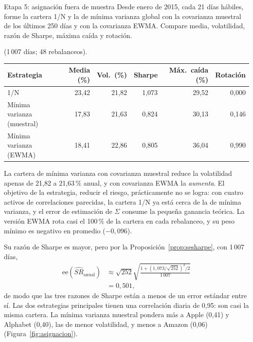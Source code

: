 \begin{ejresuelto}{Etapa 5: asignación fuera de muestra}\label{ej:etapa5}
\enunciado Desde enero de 2015, cada 21 días hábiles, forme la cartera 1/N y la de mínima varianza global con la covarianza muestral de los últimos 250 días y
con la covarianza EWMA. Compare media, volatilidad, razón de Sharpe, máxima caída y rotación.

\solucion
{} (1\,007 días; 48 rebalanceos).
\begin{center}\small
\begin{tabular}{@{}lrrrrr@{}}
\toprule
Estrategia & Media (\%) & Vol.\ (\%) & Sharpe & Máx.\ caída (\%) & Rotación \\
\midrule
1/N & 23,42 & 21,82 & 1,073 & 29,52 & 0,000 \\
Mínima varianza (muestral) & 17,83 & 21,63 & 0,824 & 30,13 & 0,146 \\
Mínima varianza (EWMA) & 18,41 & 22,86 & 0,805 & 36,04 & 0,990 \\
\bottomrule
\end{tabular}
\end{center}
La cartera de mínima varianza con covarianza muestral reduce la volatilidad apenas de 21,82 a 21,63\,\% anual, y con covarianza EWMA la \emph{aumenta}. El
objetivo de la estrategia, reducir el riesgo, prácticamente no se logra: con cuatro activos de correlaciones parecidas, la cartera 1/N ya está cerca de la de
mínima varianza, y el error de estimación de $\Sigma$ consume la pequeña ganancia teórica. La versión EWMA rota casi el 100\,\% de la cartera en cada
rebalanceo, y su peso mínimo es negativo en promedio ($-0{,}096$).

 Su razón de Sharpe es mayor, pero por la Proposición~\ref{prop:sesharpe}, con 1\,007 días,
\begin{align*}
  \text{ee}(\widehat{SR}_{\text{anual}}) &\approx \sqrt{252}\sqrt{\frac{1+(1{,}073/\sqrt{252})^2/2}{1\,007}}\\
                                         &= 0{,}501,
\end{align*}
de modo que las tres razones de Sharpe están a menos de un error estándar entre sí. Las dos estrategias principales tienen una correlación diaria de 0,95: son
casi la misma cartera. La mínima varianza muestral pondera más a Apple (0,41) y Alphabet (0,40), las de menor volatilidad, y menos a Amazon (0,06)
(Figura~\ref{fig:asignacion}).



\end{ejresuelto}
